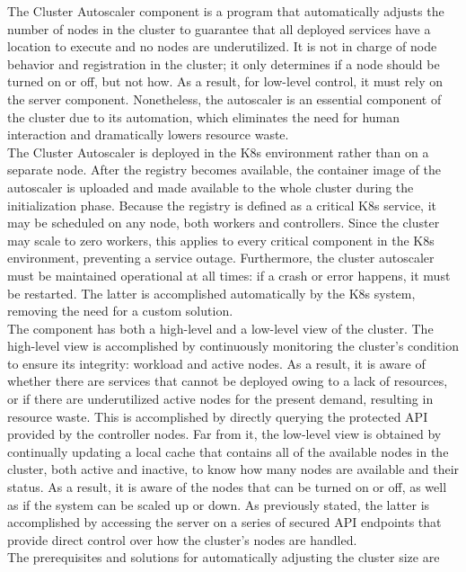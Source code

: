 The Cluster Autoscaler component is a program that automatically adjusts the
number of nodes in the cluster to guarantee that all deployed services have a
location to execute and no nodes are underutilized\cite{cluster_autoscaler}. It
is not in charge of node behavior and registration in the cluster; it only determines
if a node should be turned on or off, but not how. As a result, for low-level
control, it must rely on the server component. Nonetheless, the autoscaler is an
essential component of the cluster due to its automation, which eliminates the
need for human interaction and dramatically lowers resource waste. \\ %
The Cluster Autoscaler is deployed in the K8s environment rather than on a
separate node. After the registry becomes available, the container image of the
autoscaler is uploaded and made available to the whole cluster during the
initialization phase. Because the registry is defined as a critical K8s service,
it may be scheduled on any node, both workers and controllers. Since the cluster
may scale to zero workers, this applies to every critical component in the K8s environment,
preventing a service outage. Furthermore, the cluster autoscaler must be
maintained operational at all times: if a crash or error happens, it must be
restarted. The latter is accomplished automatically by the K8s system, removing
the need for a custom solution. \\ %
The component has both a high-level and a low-level view of the cluster. The high-level
view is accomplished by continuously monitoring the cluster's condition to ensure
its integrity: workload and active nodes. As a result, it is aware of whether
there are services that cannot be deployed owing to a lack of resources, or if there
are underutilized active nodes for the present demand, resulting in resource
waste. This is accomplished by directly querying the protected API provided by the
controller nodes. Far from it, the low-level view is obtained by continually updating
a local cache that contains all of the available nodes in the cluster, both
active and inactive, to know how many nodes are available and their status. As a
result, it is aware of the nodes that can be turned on or off, as well as if the
system can be scaled up or down. As previously stated, the latter is
accomplished by accessing the server on a series of secured API endpoints that
provide direct control over how the cluster's nodes are handled. \\ %
The prerequisites and solutions for automatically adjusting the cluster size are
